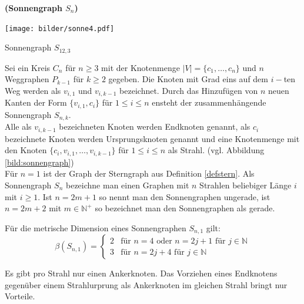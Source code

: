 \begin{defi}{\textbf{(Sonnengraph $S_{n}$)}}
\label{sun}
\begin{floatingfigure}[r]{180pt}
{\centering
\hspace*{0.1cm}
 		 \texttt{[image: bilder/sonne4.pdf]}}
   \caption{Sonnengraph $S_{12,3}$}
   \label{bild:sonnengraph}
\end{floatingfigure}
Sei ein Kreis $C_n$ für $n \geq 3$ mit der Knotenmenge $|V|=\{ c_1, \ldots , c_n \}$ und $n$ Weggraphen $P_{k-1}$ für $k \geq 2$ gegeben. Die Knoten mit Grad eins auf dem $i-$ten Weg werden als $v_{i,1}$ und $v_{i,k-1}$ bezeichnet. Durch das Hinzufügen von $n$ neuen Kanten der Form $\{v_{i,1},c_i\}$ für $1 \leq i \leq n$ ensteht der zusammenhängende Sonnengraph $S_{n,k}$.\\
Alle als $v_{i,k-1}$ bezeichneten Knoten werden Endknoten genannt, als $c_i$ bezeichnete Knoten werden Ursprungsknoten genannt und eine Knotenmenge mit den Knoten $\{c_i,v_{i,1}, \ldots ,v_{i,k-1}\}$ für $1 \leq i \leq n$ als Strahl. (vgl. Abbildung \ref{bild:sonnengraph})\\
Für $n=1$ ist der Graph der Sterngraph aus Definition \ref{defstern}. Als Sonnengraph $S_n$ bezeichne man einen Graphen mit $n$ Strahlen beliebiger Länge $i$ mit $i \geq 1$. Ist $n=2m+1$ so nennt man den Sonnengraphen ungerade, ist $n=2m+2$ mit $m \in \mathbb{N}^+$ so bezeichnet man den Sonnengraphen als gerade.
\par
\end{defi}
\newpage
\begin{lem}\cite{sun}
\label{sun1}
Für die metrische Dimension eines Sonnengraphen $S_{n,1}$ gilt:
\begin{equation}
   \beta(S_{n,1})=
   \begin{cases}
     2 & \text{f\"ur } n = 4 \text{ oder } n = 2j+1 \text{ f\"ur } j \in \mathbb{N} \\
     3 & \text{f\"ur } n = 2j+4 \text{ f\"ur } j \in \mathbb{N} 
   \end{cases}
\end{equation}
\end{lem}
\begin{lem}
\label{knotenimstrahl}
Es gibt pro Strahl nur einen Ankerknoten. Das Vorziehen eines Endknotens gegenüber einem Strahlurprung als Ankerknoten im gleichen Strahl bringt nur Vorteile.
\end{lem}
